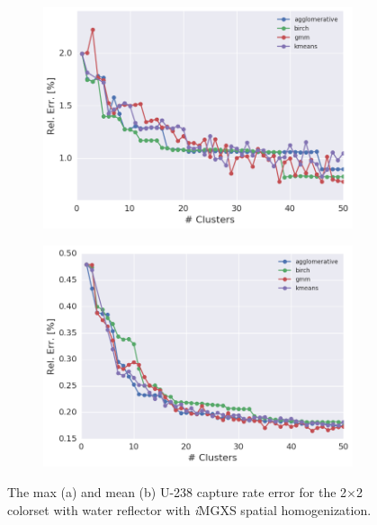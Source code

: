 \begin{figure}[h!]
\centering
\begin{subfigure}{0.9\textwidth}
  \centering
  \includegraphics[width=\linewidth]{figures/results/err-by-cluster/reflector/max-rel-err}
  \caption{}
  \label{fig:chap11-max-capt-err-by-cluster-refl}
\end{subfigure}
\begin{subfigure}{0.9\textwidth}
  \centering
  \includegraphics[width=\linewidth]{figures/results/err-by-cluster/reflector/mean-rel-err}
  \caption{}
  \label{fig:chap11-mean-capt-err-by-cluster-refl}
\end{subfigure}
\caption[U-238 capture rate error variation with the number of clusters]{The max (a) and mean (b) U-238 capture rate error for the 2$\times$2 colorset with water reflector with \textit{i}\ac{MGXS} spatial homogenization.}
\label{fig:chap11-capt-err-by-cluster-refl}
\end{figure}

